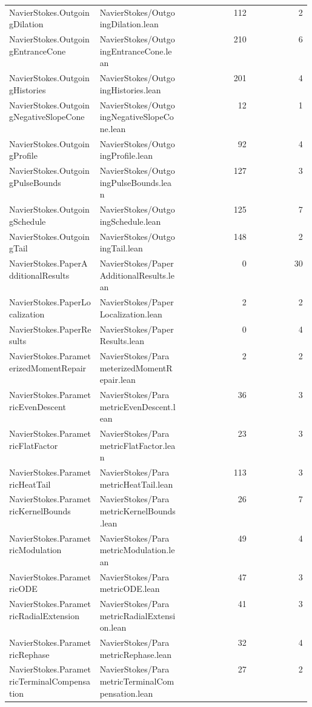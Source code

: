 \begin{longtable}{p{0.30\linewidth}p{0.28\linewidth}rr}
NavierStokes.OutgoingDilation & NavierStokes/OutgoingDilation.lean & 112 & 2\\
NavierStokes.OutgoingEntranceCone & NavierStokes/OutgoingEntranceCone.lean & 210 & 6\\
NavierStokes.OutgoingHistories & NavierStokes/OutgoingHistories.lean & 201 & 4\\
NavierStokes.OutgoingNegativeSlopeCone & NavierStokes/OutgoingNegativeSlopeCone.lean & 12 & 1\\
NavierStokes.OutgoingProfile & NavierStokes/OutgoingProfile.lean & 92 & 4\\
NavierStokes.OutgoingPulseBounds & NavierStokes/OutgoingPulseBounds.lean & 127 & 3\\
NavierStokes.OutgoingSchedule & NavierStokes/OutgoingSchedule.lean & 125 & 7\\
NavierStokes.OutgoingTail & NavierStokes/OutgoingTail.lean & 148 & 2\\
NavierStokes.PaperAdditionalResults & NavierStokes/PaperAdditionalResults.lean & 0 & 30\\
NavierStokes.PaperLocalization & NavierStokes/PaperLocalization.lean & 2 & 2\\
NavierStokes.PaperResults & NavierStokes/PaperResults.lean & 0 & 4\\
NavierStokes.ParameterizedMomentRepair & NavierStokes/ParameterizedMomentRepair.lean & 2 & 2\\
NavierStokes.ParametricEvenDescent & NavierStokes/ParametricEvenDescent.lean & 36 & 3\\
NavierStokes.ParametricFlatFactor & NavierStokes/ParametricFlatFactor.lean & 23 & 3\\
NavierStokes.ParametricHeatTail & NavierStokes/ParametricHeatTail.lean & 113 & 3\\
NavierStokes.ParametricKernelBounds & NavierStokes/ParametricKernelBounds.lean & 26 & 7\\
NavierStokes.ParametricModulation & NavierStokes/ParametricModulation.lean & 49 & 4\\
NavierStokes.ParametricODE & NavierStokes/ParametricODE.lean & 47 & 3\\
NavierStokes.ParametricRadialExtension & NavierStokes/ParametricRadialExtension.lean & 41 & 3\\
NavierStokes.ParametricRephase & NavierStokes/ParametricRephase.lean & 32 & 4\\
NavierStokes.ParametricTerminalCompensation & NavierStokes/ParametricTerminalCompensation.lean & 27 & 2\\

\end{longtable}
